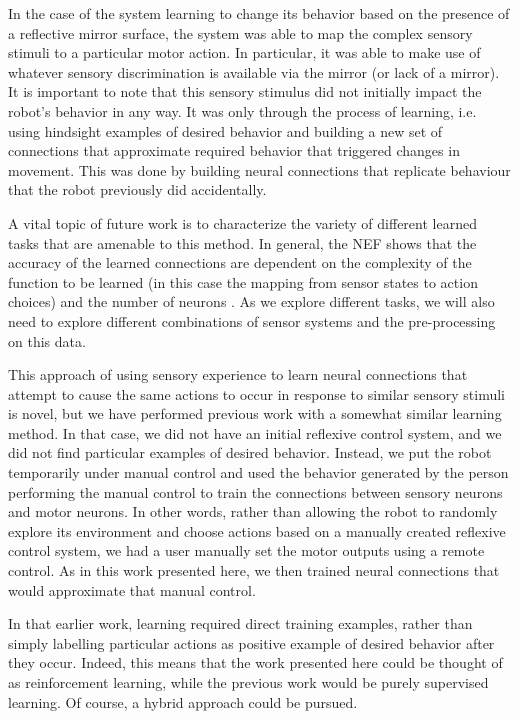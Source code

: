 \documentclass{frontiersSCNS}
\begin{document}
In the case of the system learning to change its behavior based on the 
presence of a reflective mirror surface, the system was able to map the 
complex sensory stimuli to a particular motor action.  In particular, it
was able to make use of whatever sensory discrimination is available via
the mirror (or lack of a mirror).  It is important to note that this sensory 
stimulus did not initially impact the robot's behavior in any way. It was 
only through the process of learning, i.e. using hindsight examples of desired 
behavior and building a new set of connections that approximate required 
behavior that triggered changes in movement.  This was done by building neural
connections that replicate behaviour that the robot previously did accidentally.

A vital topic of future work is to characterize the variety of different
learned tasks that are amenable to this method.  In general, the NEF shows
that the accuracy of the learned connections are dependent on the complexity
of the function to be learned (in this case the mapping from sensor states to
action choices) and the number of neurons \citep{eliasmith2004neural}.  As we explore different tasks,
we will also need to explore different combinations of sensor systems and
the pre-processing on this data.  

This approach of using sensory experience to learn neural connections
that attempt to cause the same actions to occur in response to similar
sensory stimuli is novel, but we have performed previous work \citep{conradt2014trainable}
with a somewhat similar learning method. In that case, we did not have an 
initial reflexive control system, and we did not find particular examples of 
desired behavior. Instead, we put the robot temporarily under manual control 
and used the behavior generated by the person performing the manual control 
to train the connections between sensory neurons and motor neurons.  In other
words, rather than allowing the robot to randomly explore its environment and
choose actions based on a manually created reflexive control system, we had
a user manually set the motor outputs using a remote control.  As in this work
presented here, we then trained neural connections that would approximate that
manual control.  

In that earlier work, learning required direct training examples, rather than 
simply labelling particular actions as positive example of desired behavior 
after they occur.  Indeed, this means that the work presented here could be 
thought of as reinforcement learning, while the previous work would be purely 
supervised learning. Of course, a hybrid approach could be pursued. 
\end{document}
